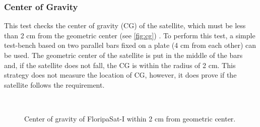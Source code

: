 \subsubsection{Center of Gravity}

This test checks the center of gravity (CG) of the satellite, which must be less than 2 cm from the geometric center (see \autoref{fig:cg}) \cite{cds}. To perform this test, a simple test-bench based on two parallel bars fixed on a plate (4 cm from each other) can be used. The geometric center of the satellite is put in the middle of the bars and, if the satellite does not fall, the CG is within the radius of 2 cm. This strategy does not measure the location of CG, however, it does prove if the satellite follows the requirement.

\begin{figure}[!htb]
    \begin{center}
        ~
        ~
        \caption{Center of gravity of FloripaSat-I within 2 cm from geometric center.}
        \label{fig:cg}
    \end{center}
\end{figure}

